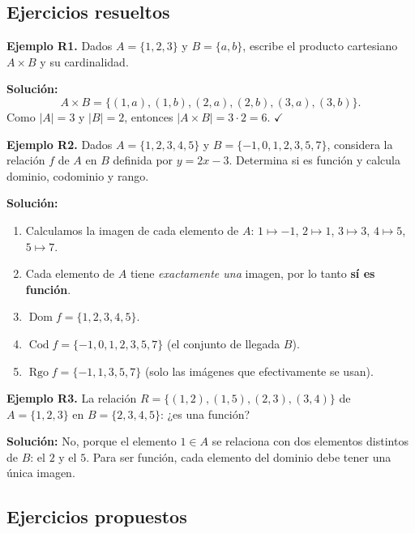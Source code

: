 \documentclass[12pt, letterpaper]{article}
\begin{document}
\subsection{Ejercicios resueltos}

\textbf{Ejemplo R1.} Dados $A = \{1, 2, 3\}$ y $B = \{a, b\}$, escribe el producto cartesiano $A \times B$ y su cardinalidad.

\begin{cuadrosolucion}
  \textbf{Solución:}
  $$A \times B = \{(1,a), (1,b), (2,a), (2,b), (3,a), (3,b)\}.$$
  Como $|A| = 3$ y $|B| = 2$, entonces $|A \times B| = 3 \cdot 2 = 6$. $\checkmark$
\end{cuadrosolucion}


\textbf{Ejemplo R2.} Dados $A = \{1, 2, 3, 4, 5\}$ y $B = \{-1, 0, 1, 2, 3, 5, 7\}$, considera la relación $f$ de $A$ en $B$ definida por $y = 2x - 3$. Determina si es función y calcula dominio, codominio y rango.

\begin{cuadrosolucion}
  \textbf{Solución:}
  \begin{enumerate}
    \item Calculamos la imagen de cada elemento de $A$: $1\mapsto-1$, $2\mapsto1$, $3\mapsto3$, $4\mapsto5$, $5\mapsto7$.
    \item Cada elemento de $A$ tiene \emph{exactamente una} imagen, por lo tanto \textbf{sí es función}.
    \item $\operatorname{Dom} f = \{1, 2, 3, 4, 5\}$.
    \item $\operatorname{Cod} f = \{-1, 0, 1, 2, 3, 5, 7\}$ (el conjunto de llegada $B$).
    \item $\operatorname{Rgo} f = \{-1, 1, 3, 5, 7\}$ (solo las imágenes que efectivamente se usan).
  \end{enumerate}
\end{cuadrosolucion}

\textbf{Ejemplo R3.} La relación $R = \{(1, 2), (1, 5), (2, 3), (3, 4)\}$ de $A = \{1, 2, 3\}$ en $B = \{2, 3, 4, 5\}$: ¿es una función?

\begin{cuadrosolucion}
  \textbf{Solución:} No, porque el elemento $1 \in A$ se relaciona con dos elementos distintos de $B$: el $2$ y el $5$. Para ser función, cada elemento del dominio debe tener una única imagen.
\end{cuadrosolucion}


\subsection{Ejercicios propuestos}
\end{document}
